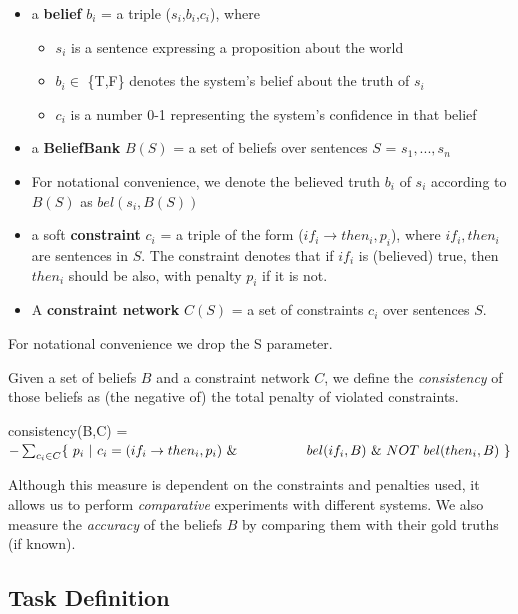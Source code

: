\documentclass[11pt]{article}
\newenvironment{myquote}{                   %
  \parskip 0mm \begin{quoting}[vskip=0mm,leftmargin=2mm]}{
\end{quoting}}
\newenvironment{ite}{                     %
     \parskip 0cm \begin{itemize} \parskip 0cm \parsep 0cm \itemsep 0cm \topsep 0cm}{
        \end{itemize}} %
\begin{document}
\begin{ite}
 \item a {\bf belief} $b_i$ = a triple ($s_i$,$b_i$,$c_i$), where
    \begin{ite}
     \item $s_i$ is a sentence expressing a proposition about the world
     \item $b_i \in$ \{T,F\} denotes the system's belief about the truth of $s_i$
     \item $c_i$ is a number 0-1 representing the system's confidence in that belief
    \end{ite}
 \item a {\bf BeliefBank} $B(S)$ = a set of beliefs over sentences $S$ = $s_1,...,s_n$
 \item For notational convenience, we denote the believed truth $b_i$ of $s_i$ according to $B(S)$ as $bel(s_i,B(S))$
 \item a soft {\bf constraint} $c_i$ = a triple of the form ($if_i \rightarrow then_i, p_i$),
   where $if_i, then_i$ are sentences in $S$. The constraint denotes
   that if $if_i$ is (believed) true, then $then_i$ should be also, with
   penalty $p_i$ if it is not.
 \item A {\bf constraint network} $C(S)$ = a set of constraints $c_i$ over sentences $S$.
\end{ite}
For notational convenience we drop the S parameter.

Given a set of beliefs $B$ and a constraint network $C$, we define the {\it consistency}
of those beliefs as (the negative of) the total penalty of violated constraints.
 \begin{myquote}
  consistency(B,C) = \\
\hspace*{2mm}  $- \sum_{c_i \in C} \{~ p_i ~ | ~ c_i = (if_i \rightarrow then_i, p_i )       ~\& \\
\hspace*{18mm}  bel(if_i,B) ~ \& ~ NOT~bel(then_i,B)~ \}$
\end{myquote}
Although this measure is dependent on the constraints and penalties used,
it allows us to perform {\it comparative} experiments with different systems.
We also measure the {\it accuracy} of the beliefs $B$ by comparing them
with their gold truths (if known).

\subsection{Task Definition}
\end{document}
